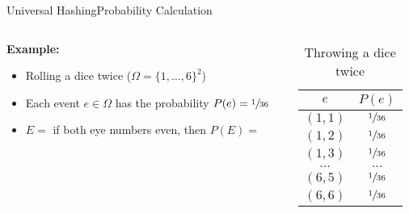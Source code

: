 \begin{frame}{Universal Hashing}{Probability Calculation}
  \begin{columns}
    \begin{column}{0.65\linewidth}
      \textbf{Example:}
      \begin{itemize}
        \item<2->
          Rolling a dice twice ({\color{Mittel-Blau}$\Omega = \{1,\dots,6\}^2$})
        \item<3->
          Each event {\color{Mittel-Blau}$e \in \Omega$} has the probability
          {\color{Mittel-Blau}$P(e) = \sfrac{1}{36}$}
        \item<4->
          {\color{Mittel-Blau}$E =$} if both eye numbers even, then {\color{Mittel-Blau}$P(E)=$}
      \end{itemize}
    \end{column}
    \begin{column}{0.35\linewidth}
      \begin{table}[!h]
        \caption{Throwing a dice twice}
        \label{tab:probabilities_rolling_dice_twice}
        \begin{tabularx}{0.8\linewidth}{c|c}
          {\color{Mittel-Blau}$e$} &{\color{Mittel-Blau} $P(e)$}\\
          \midrule
          $(1, 1)$ & $\sfrac{1}{36}$\\
          $(1, 2)$ & $\sfrac{1}{36}$\\
          $(1, 3)$ & $\sfrac{1}{36}$\\
          $\dots$ & $\dots$\\
          $(6, 5)$ & $\sfrac{1}{36}$\\
          $(6, 6)$ & $\sfrac{1}{36}$\\
        \end{tabularx}
      \end{table}
    \end{column}
  \end{columns}
\end{frame}


